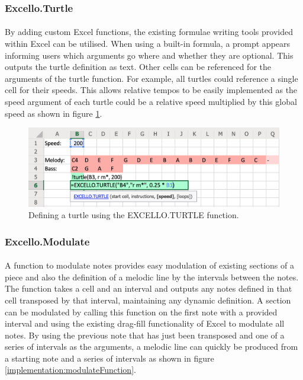 \subsubsection{Excello.Turtle}

\paragraph{} By adding custom Excel functions, the existing formulae writing tools provided within Excel can be utilised. When using a built-in formula, a prompt appears informing users which arguments go where and whether they are optional. This outputs the turtle definition as text. Other cells can be referenced for the arguments of the turtle function. For example, all turtles could reference a single cell for their speeds. This allows relative tempos to be easily implemented as the speed argument of each turtle could be a relative speed multiplied by this global speed as shown in figure \ref{implementation:turtleFunction}.

\begin{figure}[tbh]
\centerline{\includegraphics[width=150mm]{figs/turtleFunction.png}}
\caption{Defining a turtle using the EXCELLO.TURTLE function.}
\label{implementation:turtleFunction}
\end{figure}

\subsubsection{Excello.Modulate}

\paragraph{} A function to modulate notes provides easy modulation of existing sections of a piece and also the definition of a melodic line by the intervals between the notes. The function takes a cell and an interval and outputs any notes defined in that cell transposed by that interval, maintaining any dynamic definition. A section can be modulated by calling this function on the first note with a provided interval and using the existing drag-fill functionality of Excel to modulate all notes. By using the previous note that has just been transposed and one of a series of intervals as the arguments, a melodic line can quickly be produced from a starting note and a series of intervals as shown in figure \ref{implementation:modulateFunction}.

